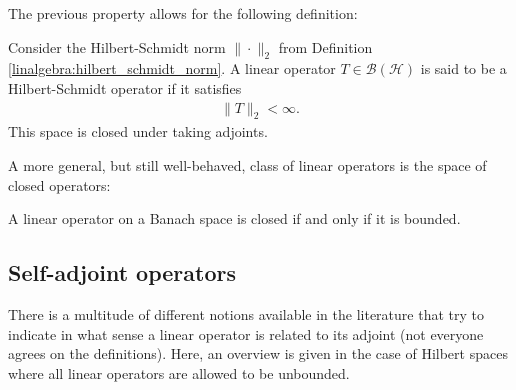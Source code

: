     The previous property allows for the following definition:

    \begin{example}\label{functional:hilbert_schmidt}
        Consider the Hilbert-Schmidt norm $\|\cdot\|_2$ from Definition \ref{linalgebra:hilbert_schmidt_norm}. A linear operator $T\in\mathcal{B}(\mathcal{H})$ is said to be a Hilbert-Schmidt operator if it satisfies
        \begin{gather}
            \|T\|_2<\infty.
        \end{gather}
        This space is closed under taking adjoints.
    \end{example}

    A more general, but still well-behaved, class of linear operators is the space of closed operators:

    \begin{theorem}
        A linear operator on a Banach space is closed if and only if it is bounded.
    \end{theorem}

\subsection{Self-adjoint operators}

    There is a multitude of different notions available in the literature that try to indicate in what sense a linear operator is related to its adjoint (not everyone agrees on the definitions). Here, an overview is given in the case of Hilbert spaces where all linear operators are allowed to be unbounded.

